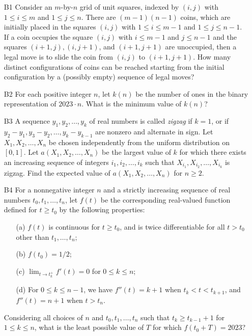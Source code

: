 \documentclass[amssymb,twocolumn,pra,10pt,aps,nofootinbib]{revtex4-1}
\begin{document}
\begin{itemize}
\item[B1]
Consider an $m$-by-$n$ grid of unit squares, indexed by $(i,j)$ with $1 \leq i \leq m$ and $1 \leq j \leq n$. There are $(m-1)(n-1)$ coins, which are initially placed in the squares $(i,j)$ with $1 \leq i \leq m-1$ and $1 \leq j \leq n-1$. If a coin occupies the square $(i,j)$ with $i \leq m-1$ and $j \leq n-1$ and the squares $(i+1,j), (i,j+1)$, and $(i+1,j+1)$ are unoccupied, then a legal move is to slide the coin from $(i,j)$ to $(i+1,j+1)$. How many distinct configurations of coins can be reached starting from the initial configuration by a (possibly empty) sequence of legal moves?

\item[B2]
For each positive integer $n$, let $k(n)$ be the number of ones in the binary representation of $2023 \cdot n$. What is the minimum value of $k(n)$?

\item[B3]
A sequence $y_1,y_2,\dots,y_k$ of real numbers is called \emph{zigzag} if $k=1$, or if $y_2-y_1, y_3-y_2, \dots, y_k-y_{k-1}$ are nonzero and alternate in sign. Let $X_1,X_2,\dots,X_n$ be chosen independently from the uniform distribution on $[0,1]$. Let $a(X_1,X_2,\dots,X_n)$ be the largest value of $k$ for which there exists an increasing sequence of integers $i_1,i_2,\dots,i_k$ such that $X_{i_1},X_{i_2},\dots,X_{i_k}$ is zigzag. Find the expected value of $a(X_1,X_2,\dots,X_n)$ for $n \geq 2$.

\item[B4]
For a nonnegative integer $n$ and a strictly increasing sequence of real numbers $t_0,t_1,\dots,t_n$, let $f(t)$ be the corresponding real-valued function defined for $t \geq t_0$ by the following properties:
\begin{enumerate}
\item[(a)] $f(t)$ is continuous for $t \geq t_0$, and is twice differentiable for all $t>t_0$ other than $t_1,\dots,t_n$;
\item[(b)] $f(t_0) = 1/2$;
\item[(c)] $\lim_{t \to t_k^+} f'(t) = 0$ for $0 \leq k \leq n$;
\item[(d)] For $0 \leq k \leq n-1$, we have $f''(t) = k+1$ when $t_k < t< t_{k+1}$, and $f''(t) = n+1$ when $t>t_n$.
\end{enumerate}
Considering all choices of $n$ and $t_0,t_1,\dots,t_n$ such that $t_k \geq t_{k-1}+1$ for $1 \leq k \leq n$, what is the least possible value of $T$ for which $f(t_0+T) = 2023$?


\end{itemize}
\end{document}
